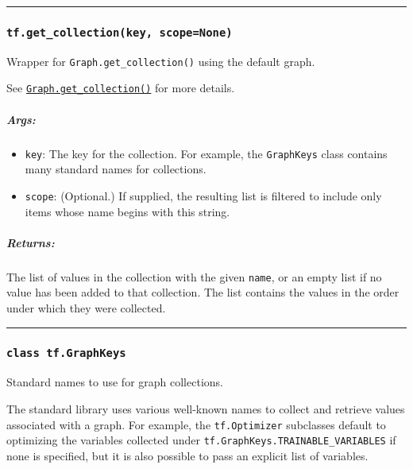 \begin{center}\rule{0.5\linewidth}{\linethickness}\end{center}

\subsubsection{\texorpdfstring{\lstinline{tf.get_collection(key, scope=None)}
}{tf.get_collection(key, scope=None) }}\label{tf.getux5fcollectionkey-scopenone}

Wrapper for \lstinline{Graph.get_collection()} using the default graph.

See
\href{../../api_docs/python/framework.md\#Graph.get_collection}{\lstinline{Graph.get_collection()}}
for more details.

\subparagraph{Args: }\label{args-27}

\begin{itemize}
\tightlist
\item
  \lstinline{key}: The key for the collection. For example, the
  \lstinline{GraphKeys} class contains many standard names for collections.
\item
  \lstinline{scope}: (Optional.) If supplied, the resulting list is
  filtered to include only items whose name begins with this string.
\end{itemize}

\subparagraph{Returns: }\label{returns-30}

The list of values in the collection with the given \lstinline{name}, or an
empty list if no value has been added to that collection. The list
contains the values in the order under which they were collected.

\begin{center}\rule{0.5\linewidth}{\linethickness}\end{center}

\subsubsection{\texorpdfstring{\lstinline{class tf.GraphKeys}
}{class tf.GraphKeys }}\label{class-tf.graphkeys}

Standard names to use for graph collections.

The standard library uses various well-known names to collect and
retrieve values associated with a graph. For example, the
\lstinline{tf.Optimizer} subclasses default to optimizing the variables
collected under \lstinline{tf.GraphKeys.TRAINABLE_VARIABLES} if none is
specified, but it is also possible to pass an explicit list of
variables.


